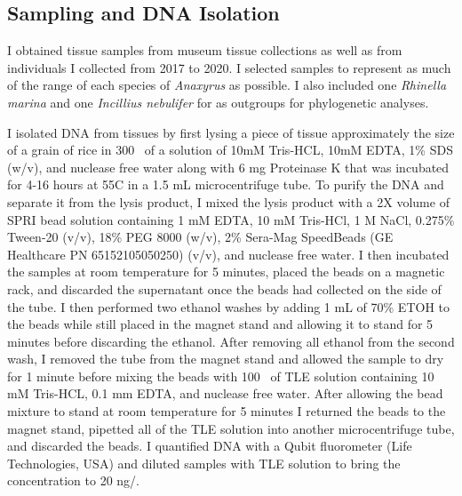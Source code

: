 \subsection{Sampling and DNA Isolation}
I obtained tissue samples from museum tissue collections as well as from individuals   
I collected from 2017 to 2020. I selected samples to represent as much
of the range of each species of \textit{Anaxyrus} as possible.
I also included one \textit{Rhinella marina} and one \textit{Incillius nebulifer} 
for as outgroups for phylogenetic analyses.

I isolated DNA from tissues by first lysing a piece of tissue approximately 
the size of a grain of rice in 300 \uL\ of a solution of 10mM Tris-HCL, 10mM EDTA, 
1\% SDS (w/v), and nuclease free water along with 6 mg Proteinase K that was 
incubated for 4-16 hours at 55\degree C in a 1.5 mL microcentrifuge tube.  
To purify the DNA and separate it from the lysis product, I mixed the lysis 
product with a 2X volume of SPRI bead solution containing 1 mM EDTA,  
10 mM Tris-HCl, 1 M NaCl, 0.275\% Tween-20 (v/v), 18\% PEG 8000 (w/v), 
2\% Sera-Mag SpeedBeads (GE Healthcare PN 65152105050250) (v/v), and nuclease free water.
I then incubated the samples at room temperature for 5 minutes, placed the 
beads on a magnetic rack, and discarded the supernatant once the beads had collected
on the side of the tube.  
I then performed two ethanol washes by adding 1 mL of 70\% ETOH to the beads
while still placed in the magnet stand and allowing it to stand for 5 minutes
before discarding the ethanol. 
After removing all ethanol from the second wash, I removed the tube from the magnet 
stand and allowed the sample to dry for 1 minute before mixing the beads with 100 \uL\ of 
TLE solution containing 10 mM Tris-HCL, 0.1 mm EDTA, and nuclease free water.
After allowing the bead mixture to stand at room temperature for 5 minutes I returned
the beads to the magnet stand, pipetted all of the TLE solution into another 
microcentrifuge tube, and discarded the beads. I quantified DNA with a Qubit
fluorometer (Life Technologies, USA) and diluted samples with TLE solution to 
bring the concentration to 20 ng/\uL.

